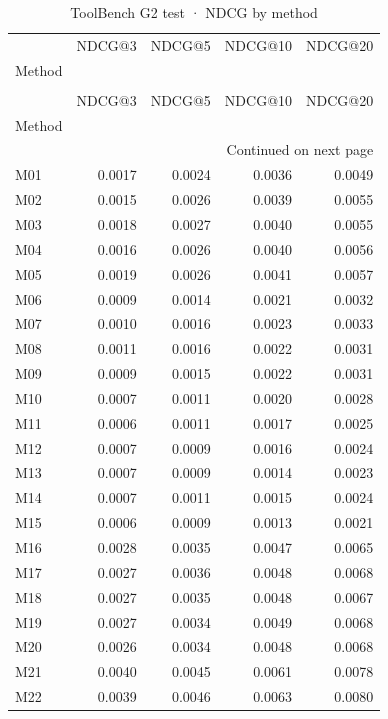 \begin{longtable}{lrrrr}
\caption{ToolBench G2 test · NDCG by method} \label{tab:ToolBench-G2-test-family-family-ndcg} \\
\toprule
 & NDCG@3 & NDCG@5 & NDCG@10 & NDCG@20 \\
Method &  &  &  &  \\
\midrule
\endfirsthead
\caption[]{ToolBench G2 test · NDCG by method} \\
\toprule
 & NDCG@3 & NDCG@5 & NDCG@10 & NDCG@20 \\
Method &  &  &  &  \\
\midrule
\endhead
\midrule
\multicolumn{5}{r}{Continued on next page} \\
\midrule
\endfoot
\bottomrule
\endlastfoot
M01 & 0.0017 & 0.0024 & 0.0036 & 0.0049 \\
M02 & 0.0015 & 0.0026 & 0.0039 & 0.0055 \\
M03 & 0.0018 & 0.0027 & 0.0040 & 0.0055 \\
M04 & 0.0016 & 0.0026 & 0.0040 & 0.0056 \\
M05 & 0.0019 & 0.0026 & 0.0041 & 0.0057 \\
M06 & 0.0009 & 0.0014 & 0.0021 & 0.0032 \\
M07 & 0.0010 & 0.0016 & 0.0023 & 0.0033 \\
M08 & 0.0011 & 0.0016 & 0.0022 & 0.0031 \\
M09 & 0.0009 & 0.0015 & 0.0022 & 0.0031 \\
M10 & 0.0007 & 0.0011 & 0.0020 & 0.0028 \\
M11 & 0.0006 & 0.0011 & 0.0017 & 0.0025 \\
M12 & 0.0007 & 0.0009 & 0.0016 & 0.0024 \\
M13 & 0.0007 & 0.0009 & 0.0014 & 0.0023 \\
M14 & 0.0007 & 0.0011 & 0.0015 & 0.0024 \\
M15 & 0.0006 & 0.0009 & 0.0013 & 0.0021 \\
M16 & 0.0028 & 0.0035 & 0.0047 & 0.0065 \\
M17 & 0.0027 & 0.0036 & 0.0048 & 0.0068 \\
M18 & 0.0027 & 0.0035 & 0.0048 & 0.0067 \\
M19 & 0.0027 & 0.0034 & 0.0049 & 0.0068 \\
M20 & 0.0026 & 0.0034 & 0.0048 & 0.0068 \\
M21 & 0.0040 & 0.0045 & 0.0061 & 0.0078 \\
M22 & 0.0039 & 0.0046 & 0.0063 & 0.0080 \\

\end{longtable}
